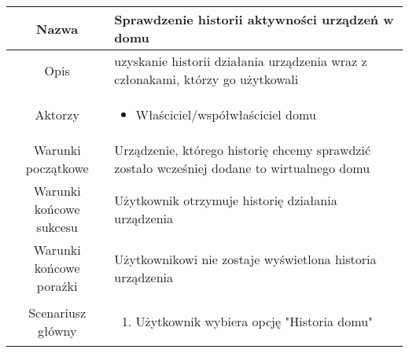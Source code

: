 \documentclass{article}
\begin{document}
\begin{enumerate}
\begin{enumerate}
				\begin{table}[H]
					\centering
					\begin{tabular}{|c|p{7cm}|}
						\hline
						Nazwa                   & \textbf{Sprawdzenie historii aktywności urządzeń w domu}                                                                                                                                                                                                                                                                                                                \\
						\hline
						Opis                    & uzyskanie historii działania urządzenia wraz z członakami, którzy go użytkowali                                                                                                                                                                                                                                                                                         \\
						\hline
						Aktorzy                 & \begin{itemize}\item Właściciel/współwłaściciel domu\end{itemize}                                                                                                                                                                                                                                                                                                       \\
						\hline
						Warunki początkowe      & Urządzenie, którego historię chcemy sprawdzić zostało wcześniej dodane to wirtualnego domu                                                                                                                                                                                                                                                                              \\
						\hline
						Warunki końcowe sukcesu & Użytkownik otrzymuje historię działania urządzenia                                                                                                                                                                                                                                                                                                                      \\
						\hline
						Warunki końcowe porażki & Użytkownikowi nie zostaje wyświetlona historia urządzenia                                                                                                                                                                                                                                                                                                               \\
						\hline
						Scenariusz główny       & \begin{enumerate}\item Użytkownik wybiera opcję "Historia domu"


\end{enumerate}
\end{tabular}
\end{table}
\end{enumerate}
\end{enumerate}
\end{document}
